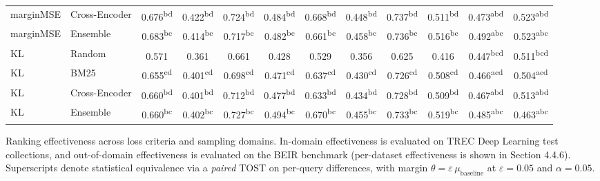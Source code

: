 \begin{table}[t]
\begin{tabular}{llcccccccccc}
  marginMSE & Cross-Encoder & 0.676\textsuperscript{bd\phantom{a}} & 0.422\textsuperscript{bd\phantom{a}} & 0.724\textsuperscript{bd\phantom{a}} & 0.484\textsuperscript{bd\phantom{a}} & 0.668\textsuperscript{bd\phantom{a}} & 0.448\textsuperscript{bd\phantom{a}} & 0.737\textsuperscript{bd\phantom{a}} & 0.511\textsuperscript{bd\phantom{a}} & 0.473\textsuperscript{abd\phantom{}} & 0.523\textsuperscript{abd\phantom{}} \\
  marginMSE & Ensemble & 0.683\textsuperscript{bc\phantom{a}} & 0.414\textsuperscript{bc\phantom{a}} & 0.717\textsuperscript{bc\phantom{a}} & 0.482\textsuperscript{bc\phantom{a}} & 0.661\textsuperscript{bc\phantom{a}} & 0.458\textsuperscript{bc\phantom{a}} & 0.736\textsuperscript{bc\phantom{a}} & 0.516\textsuperscript{bc\phantom{a}} & 0.492\textsuperscript{abc\phantom{}} & 0.523\textsuperscript{abc\phantom{}} \\
  KL & Random & 0.571\textsuperscript{\phantom{aaa}} & 0.361\textsuperscript{\phantom{aaa}} & 0.661\textsuperscript{\phantom{aaa}} & 0.428\textsuperscript{\phantom{aaa}} & 0.529\textsuperscript{\phantom{aaa}} & 0.356\textsuperscript{\phantom{aaa}} & 0.625\textsuperscript{\phantom{aaa}} & 0.416\textsuperscript{\phantom{aaa}} & 0.447\textsuperscript{bcd\phantom{}} & 0.511\textsuperscript{bcd\phantom{}} \\
  KL & BM25 & 0.655\textsuperscript{cd\phantom{a}} & 0.401\textsuperscript{cd\phantom{a}} & 0.698\textsuperscript{cd\phantom{a}} & 0.471\textsuperscript{cd\phantom{a}} & 0.637\textsuperscript{cd\phantom{a}} & 0.430\textsuperscript{cd\phantom{a}} & 0.726\textsuperscript{cd\phantom{a}} & 0.508\textsuperscript{cd\phantom{a}} & 0.466\textsuperscript{acd\phantom{}} & 0.504\textsuperscript{acd\phantom{}} \\
  KL & Cross-Encoder & 0.660\textsuperscript{bd\phantom{a}} & 0.401\textsuperscript{bd\phantom{a}} & 0.712\textsuperscript{bd\phantom{a}} & 0.477\textsuperscript{bd\phantom{a}} & 0.633\textsuperscript{bd\phantom{a}} & 0.434\textsuperscript{bd\phantom{a}} & 0.728\textsuperscript{bd\phantom{a}} & 0.509\textsuperscript{bd\phantom{a}} & 0.467\textsuperscript{abd\phantom{}} & 0.513\textsuperscript{abd\phantom{}} \\
  KL & Ensemble & 0.660\textsuperscript{bc\phantom{a}} & 0.402\textsuperscript{bc\phantom{a}} & 0.727\textsuperscript{bc\phantom{a}} & 0.494\textsuperscript{bc\phantom{a}} & 0.670\textsuperscript{bc\phantom{a}} & 0.455\textsuperscript{bc\phantom{a}} & 0.733\textsuperscript{bc\phantom{a}} & 0.519\textsuperscript{bc\phantom{a}} & 0.485\textsuperscript{abc\phantom{}} & 0.463\textsuperscript{abc\phantom{}} \\
  \bottomrule
  \end{tabular}
\end{table}
  \caption{Ranking effectiveness across loss criteria and sampling domains. In-domain effectiveness is evaluated on TREC Deep Learning test collections, and out-of-domain effectiveness is evaluated on the BEIR benchmark (per-dataset effectiveness is shown in Section 4.4.6). Superscripts denote statistical equivalence via a \emph{paired} TOST on per-query differences, with margin $\theta = \varepsilon\,\mu_{\text{baseline}}$ at $\varepsilon = 0.05$ and $\alpha = 0.05$.}
  \label{tab:ch4-main-results}
